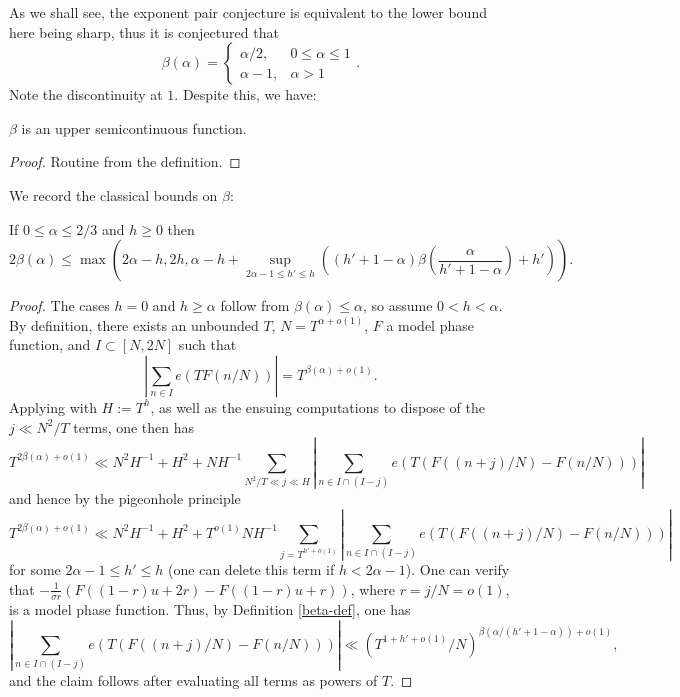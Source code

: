As we shall see, the exponent pair conjecture is equivalent to the lower bound here being sharp, thus it is conjectured that
\[
\beta(\alpha) = \begin{cases}
\alpha/2,& 0 \leq \alpha \leq 1\\
\alpha - 1,&\alpha > 1
\end{cases}.
\]
Note the discontinuity at $1$.  Despite this, we have:

\begin{lemma}\label{beta-semicts}
\leanok
$\beta$ is an upper semicontinuous function.
\end{lemma}

\begin{proof}\leanok
Routine from the definition.
\end{proof}

We record the classical bounds on $\beta$:

\begin{lemma}\label{vdca-beta}
\leanok
If $0 \leq \alpha \leq 2/3$ and $h \geq 0$ then
$$ 2\beta(\alpha) \leq \max\left( 2\alpha - h, 2h, \alpha - h + \sup_{2\alpha-1 \leq h' \leq h} \left((h'+1-\alpha)\beta\left(\frac{\alpha}{h'+1-\alpha}\right)+h'\right)\right).$$
\end{lemma}

\begin{proof}\leanok
The cases $h=0$ and $h\geq\alpha$ follow from $\beta(\alpha)\leq\alpha$, so assume $0<h<\alpha$. By definition, there exists an unbounded $T$, $N = T^{\alpha+o(1)}$, $F$ a model phase function, and $I \subset [N,2N]$ such that
    $$ \left|\sum_{n \in I} e(T F(n/N))\right| = T^{\beta(\alpha)+o(1)}.$$
Applying \cite[(2.54)]{ivic} with $H := T^h$, as well as the ensuing computations to dispose of the $j \ll N^2/T$ terms, one then has
$$ T^{2\beta(\alpha)+o(1)} \ll N^2 H^{-1} + H^2 + N H^{-1} \sum_{N^2/T \ll j \ll H} |\sum_{n \in I \cap (I-j)} e(T (F((n+j)/N) - F(n/N)))|$$
and hence by the pigeonhole principle
$$ T^{2\beta(\alpha)+o(1)} \ll N^2 H^{-1} + H^2 + T^{o(1)} N H^{-1} \sum_{j = T^{h'+o(1)}} |\sum_{n \in I \cap (I-j)} e(T (F((n+j)/N) - F(n/N)))|$$
for some $2\alpha-1 \leq h' \leq h$ (one can delete this term if $h < 2\alpha-1$).  One can verify that $-\frac{1}{\sigma r}(F((1-r)u+2r)-F((1-r)u+r))$, where $r=j/N=o(1)$, is a model phase function.  Thus, by Definition \ref{beta-def}, one has
$$ \left|\sum_{n \in I \cap (I-j)} e(T (F((n+j)/N) - F(n/N)))\right| \ll (T^{1+h'+o(1)}/N)^{\beta(\alpha/(h'+1-\alpha))+o(1)},$$
and the claim follows after evaluating all terms as powers of $T$.
\end{proof}


